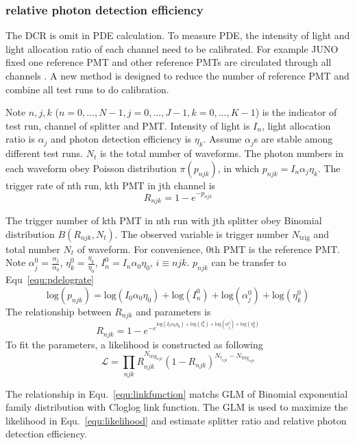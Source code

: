 \subsubsection{relative photon detection efficiency}
The DCR is omit in PDE calculation. To measure PDE, the intensity of light and light allocation ratio of each channel need to be calibrated. For example JUNO fixed one reference PMT and other reference PMTs are circulated through all channels \cite{Wonsak_2021}. A new method is designed to reduce the number of reference PMT and combine all test runs to do calibration.

Note $n,j,k$ ($n=0,...,N-1, j=0,...,J-1, k=0,...,K-1$) is the indicator of test run, channel of splitter and PMT. Intensity of light is $I_n$, light allocation ratio is $\alpha_j$ and photon detection efficiency is $\eta_k$. Assume $\alpha_j$s are stable among different test runs. $N_t$ is the total number of waveforms. The photon numbers in each waveform obey Poisson distribution $\pi(p_{njk})$, in which $p_{njk}=I_n\alpha_j\eta_k$. The trigger rate of nth run, kth PMT in jth channel is
\begin{equation}
    \label{equ:pderate}
    R_{njk}=1-e^{-p_{njk}}
\end{equation}

The trigger number of kth PMT in nth run with jth splitter obey Binomial distribution $B(R_{njk},N_t)$. The observed variable is trigger number $N_{\mathrm{trig}}$ and total number $N_{t}$ of waveform. For convenience, 0th PMT is the reference PMT. Note $\alpha_j^0=\frac{\alpha_j}{\alpha_0}$, $\eta_k^0=\frac{\eta_k}{\eta_0}$, $I_n^0=I_n\alpha_0\eta_0$, $i\equiv njk$. $p_{njk}$ can be transfer to Equ~\eqref{equ:pdelograte}
\begin{equation}
    \label{equ:pdelograte}
    \mathrm{log}(p_{njk})=\mathrm{log}(I_0\alpha_0\eta_0)+\mathrm{log}(I_n^0)+\mathrm{log}(\alpha_j^0)+\mathrm{log}(\eta_k^0)
\end{equation}
The relationship between $R_{njk}$ and parameters is
\begin{equation}
    \label{equ:linkfunction}
    R_{njk}=1-e^{-e^{\mathrm{log}(I_0\alpha_0\eta_0)+\mathrm{log}(I_n^0)+\mathrm{log}(\alpha_j^0)+\mathrm{log}(\eta_k^0)}}
\end{equation}
To fit the parameters, a likelihood is constructed as following
\begin{equation}
    \label{equ:likelihood}
    \mathcal{L}=\prod_{njk}{R_{njk}^{N_{\mathrm{trig}_{njk}}}(1-R_{njk})^{N_{t_{njk}}-N_{\mathrm{trig}_{njk}}}}
\end{equation}

The relationship in Equ.~\eqref{equ:linkfunction} matchs GLM of Binomial exponential family distribution with Cloglog link function\cite{glm}. The GLM is used to maximize the likelihood in Equ.~\eqref{equ:likelihood} and estimate splitter ratio and relative photon detection efficiency.